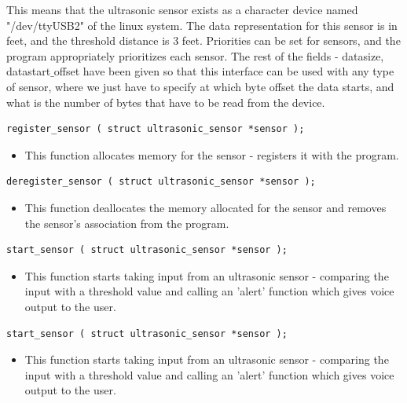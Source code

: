 \documentclass[12pt]{article}
\begin{document}
This means that the ultrasonic sensor exists as a character device named "/dev/ttyUSB2" of the linux system. The data representation for this sensor is in feet, and the threshold distance is 3 feet. Priorities can be set for sensors, and the program appropriately prioritizes each sensor. The rest of the fields - datasize, datastart$\_$offset have been given so that this interface can be used with any type of sensor, where we just have to specify at which byte offset the data starts, and what is the number of bytes that have to be read from the device.

\begin{verbatim}
register_sensor ( struct ultrasonic_sensor *sensor );
\end{verbatim}
\begin{itemize}
\item This function allocates memory for the sensor - registers it with the program.
\end{itemize}

\begin{verbatim}
deregister_sensor ( struct ultrasonic_sensor *sensor );
\end{verbatim}

\begin{itemize}
\item This function deallocates the memory allocated for the sensor and removes
the sensor's association from the program.
\end{itemize}

\begin{verbatim}
start_sensor ( struct ultrasonic_sensor *sensor );\end{verbatim}
\begin{itemize}
\item This function starts taking input from an ultrasonic sensor - comparing the input with a threshold value and calling an 'alert' function which gives voice output to the user.
\end{itemize}

\begin{verbatim}
start_sensor ( struct ultrasonic_sensor *sensor );\end{verbatim}
\begin{itemize}
\item This function starts taking input from an ultrasonic sensor - comparing the input with a threshold value and calling an 'alert' function which gives voice output to the user.
\end{itemize}
\end{document}
